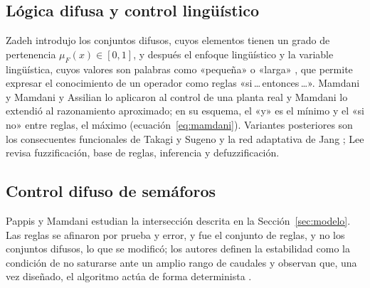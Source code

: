 \documentclass[journal]{IEEEtran}
\begin{document}
\subsection{Lógica difusa y control lingüístico}
\label{sec:sota-difusa}
Zadeh \cite{Zadeh1965} introdujo los conjuntos difusos, cuyos elementos tienen un grado de pertenencia $\mu_F(x)\in[0,1]$, y después el enfoque lingüístico \cite{Zadeh1973} y la variable lingüística, cuyos valores son palabras como «pequeña» o «larga» \cite{Zadeh1975}, que permite expresar el conocimiento de un operador como reglas «si\,\dots\,entonces\,\dots». Mamdani \cite{Mamdani1974} y Mamdani y Assilian \cite{MamdaniAssilian1975} lo aplicaron al control de una planta real y Mamdani \cite{Mamdani1977} lo extendió al razonamiento aproximado; en su esquema, el «y» es el mínimo y el «si no» entre reglas, el máximo (ecuación~\eqref{eq:mamdani}). Variantes posteriores son los consecuentes funcionales de Takagi y Sugeno \cite{TakagiSugeno1985} y la red adaptativa de Jang \cite{Jang1993}; Lee \cite{Lee1990a,Lee1990b} revisa fuzzificación, base de reglas, inferencia y defuzzificación.

\subsection{Control difuso de semáforos}
\label{sec:sota-semaforos}
Pappis y Mamdani \cite{Pappis1977} estudian la intersección descrita en la Sección~\ref{sec:modelo}. Las reglas se afinaron por prueba y error, y fue el conjunto de reglas, y no los conjuntos difusos, lo que se modificó; los autores definen la estabilidad como la condición de no saturarse ante un amplio rango de caudales y observan que, una vez diseñado, el algoritmo actúa de forma determinista \cite{Pappis1977}.
\end{document}
